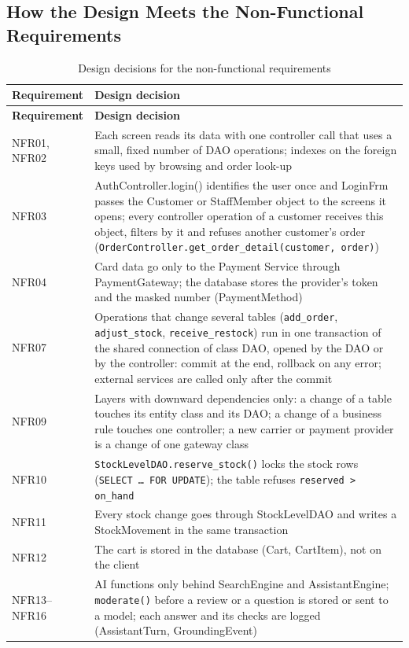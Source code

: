 \subsection{How the Design Meets the Non-Functional Requirements}
\label{subsec:nfrdesign}
{\small
\begin{xltabular}{\textwidth}{@{}L{2.4cm} Y@{}}
\caption{Design decisions for the non-functional requirements}\label{tab:nfrdesign}\\
\toprule
\textbf{Requirement} & \textbf{Design decision} \\ \midrule
\endfirsthead
\toprule
\textbf{Requirement} & \textbf{Design decision} \\ \midrule
\endhead
\bottomrule
\endlastfoot
NFR01, NFR02 & Each screen reads its data with one controller call that uses a small, fixed number of DAO operations; indexes on the foreign keys used by browsing and order look-up \\
NFR03 & \textsf{AuthController.login()} identifies the user once and \textsf{LoginFrm} passes the \textsf{Customer} or \textsf{StaffMember} object to the screens it opens; every controller operation of a customer receives this object, filters by it and refuses another customer's order (\texttt{OrderController.get\_order\_detail(customer, order)}) \\
NFR04 & Card data go only to the Payment Service through \textsf{PaymentGateway}; the database stores the provider's token and the masked number (\textsf{PaymentMethod}) \\
NFR07 & Operations that change several tables (\texttt{add\_order}, \texttt{adjust\_stock}, \texttt{receive\_restock}) run in one transaction of the shared connection of class \textsf{DAO}, opened by the DAO or by the controller: commit at the end, rollback on any error; external services are called only after the commit \\
NFR09 & Layers with downward dependencies only: a change of a table touches its entity class and its DAO; a change of a business rule touches one controller; a new carrier or payment provider is a change of one gateway class \\
NFR10 & \texttt{StockLevelDAO.reserve\_stock()} locks the stock rows (\texttt{SELECT \ldots{} FOR UPDATE}); the table refuses \texttt{reserved > on\_hand} \\
NFR11 & Every stock change goes through \textsf{StockLevelDAO} and writes a \textsf{StockMovement} in the same transaction \\
NFR12 & The cart is stored in the database (\textsf{Cart}, \textsf{CartItem}), not on the client \\
NFR13--NFR16 & AI functions only behind \textsf{SearchEngine} and \textsf{AssistantEngine}; \texttt{moderate()} before a review or a question is stored or sent to a model; each answer and its checks are logged (\textsf{AssistantTurn}, \textsf{GroundingEvent}) \\
\end{xltabular}
}

